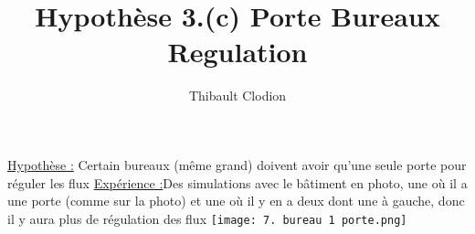\documentclass[12pt]{article}
\title{Hypothèse 3.(c) Porte Bureaux Regulation}
\author{Thibault Clodion}
\begin{document}
\maketitle %

\underline{Hypothèse :} Certain bureaux (même grand) doivent avoir qu'une seule porte pour réguler les flux
\newline\newline
\underline{Expérience :}Des simulations avec le bâtiment en photo, une où il a une porte (comme sur la photo) et une où il y en a deux dont une à gauche, donc il y aura plus de régulation des flux
\newline\texttt{[image: 7. bureau 1 porte.png]}\newline
\newline\newline
\end{document}
